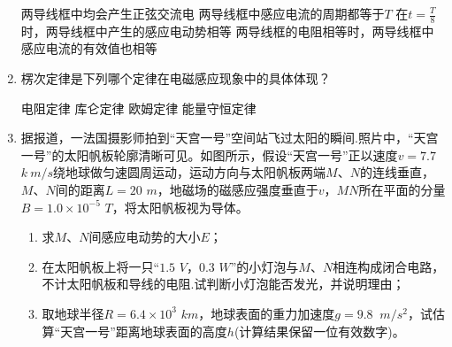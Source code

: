 \begin{enumerate}
\fourchoices
{两导线框中均会产生正弦交流电}
{两导线框中感应电流的周期都等于$ T $}
{在$ t=\frac{T}{8} $时，两导线框中产生的感应电动势相等}
{两导线框的电阻相等时，两导线框中感应电流的有效值也相等}



\item 
{}
楞次定律是下列哪个定律在电磁感应现象中的具体体现？

\fourchoices
{电阻定律}
{库仑定律}
{欧姆定律}
{能量守恒定律}




\newpage
\item 
{}
据报道，一法国摄影师拍到“天宫一号”空间站飞过太阳的瞬间.照片中，“天宫一号”的太阳帆板轮廓清晰可见。如图所示，假设“天宫一号”正以速度$ v=7.7 $ $ k \ m/s $绕地球做匀速圆周运动，运动方向与太阳帆板两端$ M $、$ N $的连线垂直，$ M $、$ N $间的距离$ L=20 $ $ m $，地磁场的磁感应强度垂直于$ v $，$ MN $所在平面的分量$ B=1.0 \times 10^{-5} $ $ T $，将太阳帆板视为导体。
\begin{enumerate}
\renewcommand{\labelenumii}{(\arabic{enumii})}

\item 
求$ M $、$ N $间感应电动势的大小$ E $；

\item 
在太阳帆板上将一只“$ 1.5 $ $ V $，$ 0.3 $ $ W $”的小灯泡与$ M $、$ N $相连构成闭合电路，不计太阳帆板和导线的电阻.试判断小灯泡能否发光，并说明理由；

\item 
取地球半径$ R=6.4 \times 10^3 $ $ km $，地球表面的重力加速度$ g=9.8 $ $ \ m/s ^{2} $，试估算“天宫一号”距离地球表面的高度$ h $(计算结果保留一位有效数字)。

\end{enumerate}
\begin{figure}[h!]
\flushright 

\end{figure}

\end{enumerate}
